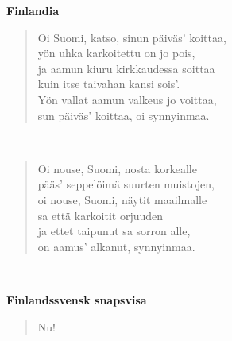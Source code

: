 %
%
\noindent\begin{minipage}{\linewidth}
\vspace{5pt}
\parbox[t]{0.85\linewidth}{\raggedright {\large\bf Finlandia}\\[6pt]}
\begin{verse}
	Oi Suomi, katso, sinun päiväs' koittaa,\\
	yön uhka karkoitettu on jo pois,\\
	ja aamun kiuru kirkkaudessa soittaa\\
	kuin itse taivahan kansi sois'.\\
	Yön vallat aamun valkeus jo voittaa,\\
	sun päiväs' koittaa, oi synnyinmaa.\\
\end{verse}
\end{minipage}\\[10pt]
\noindent\begin{minipage}{\linewidth}
\begin{verse}
	Oi nouse, Suomi, nosta korkealle\\
	pääs' seppelöimä suurten muistojen,\\
	oi nouse, Suomi, näytit maailmalle\\
	sa että karkoitit orjuuden\\
	ja ettet taipunut sa sorron alle,\\
	on aamus' alkanut, synnyinmaa.\\
\end{verse}
\end{minipage}\\[10pt]
%
%
\noindent\begin{minipage}{\linewidth}
\vspace{5pt}
\parbox[t]{0.85\linewidth}{\raggedright {\large\bf Finlandssvensk snapsvisa}\\[6pt]}
\begin{verse}
	Nu!\\
\end{verse}
\end{minipage}\\[10pt]
